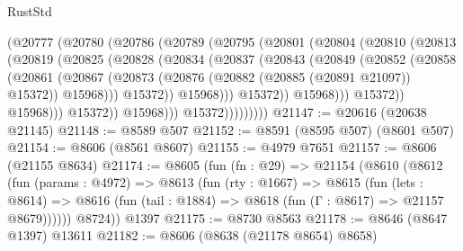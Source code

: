 \begin{lexlean}{RustStd}
\begin{coremodule}
                          (@20777
                            (@20780
                              (@20786
                                (@20789
                                  (@20795
                                    (@20801
                                      (@20804
                                        (@20810
                                          (@20813
                                            (@20819
                                              (@20825
                                                (@20828
                                                  (@20834
                                                    (@20837
                                                      (@20843
                                                        (@20849
                                                          (@20852
                                                            (@20858
                                                              (@20861
                                                                (@20867
                                                                  (@20873
                                                                    (@20876
                                                                      (@20882
                                                                        (@20885 (@20891 @21097))
                                                                        @15372))
                                                                    @15968)))
                                                              @15372))
                                                          @15968)))
                                                    @15372))
                                                @15968)))
                                          @15372))
                                      @15968)))
                                @15372))
                            @15968)))
                      @15372)))))))))
@21147 := @20616 (@20638 @21145)
@21148 := @8589 @507
@21152 := @8591 (@8595 @507) (@8601 @507)
@21154 := @8606 (@8561 @8607)
@21155 := @4979 @7651
@21157 := @8606 (@21155 @8634)
@21174 := @8605
    (fun (fn : @29) =>
    @21154
      (@8610
        (@8612
          (fun (params : @4972) =>
          @8613
            (fun (rty : @1667) =>
            @8615
              (fun (lets : @8614) =>
              @8616 (fun (tail : @1884) => @8618 (fun (Γ : @8617) => @21157 @8679))))))
        @8724))
    @1397
@21175 := @8730 @8563
@21178 := @8646 (@8647 @1397) @13611
@21182 := @8606 (@8638 (@21178 @8654) @8658)

\end{coremodule}
\end{lexlean}
